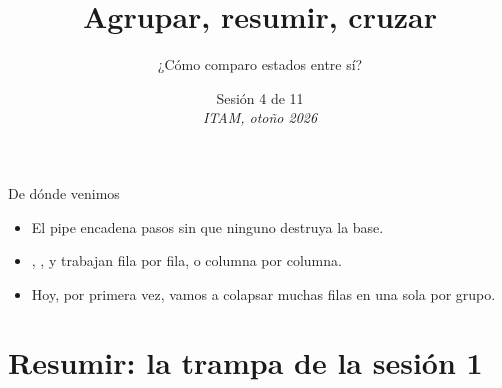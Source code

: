 %



\title[Lab de R · Sesión 4]{Agrupar, resumir, cruzar}
\subtitle{¿Cómo comparo estados entre sí?}
\date{%
  Sesión 4 de 11\\[0.3em]
  \textit{ITAM, otoño 2026}%
}



{
\begin{frame}
  \titlepage
\end{frame}}


\begin{frame}{De dónde venimos}
  \vspace{0.3em}
  \begin{itemize}\setlength{\itemsep}{0.9em}
    \item<1-> El pipe \cod{|>} encadena pasos sin que ninguno destruya la base.
    \item<2-> , ,  y 
          trabajan fila por fila, o columna por columna.
    \item<3-> Hoy, por primera vez, vamos a colapsar muchas filas en una sola
          por grupo.
  \end{itemize}
\end{frame}

\section{Resumir: la trampa de la sesión 1}


